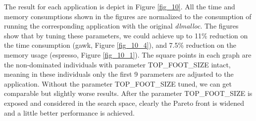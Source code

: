 The result for each application is depict in Figure \ref{fig_10}. All the time and memory consumptions shown in the figures are normalized to the consumption of running the corresponding application with the original \emph{dlmalloc}. The figures show that by tuning these parameters, we could achieve up to 11\% reduction on the time consumption (gawk, Figure \ref{fig_10_4}), and 7.5\% reduction on the memory usage (espresso, Figure \ref{fig_10_1}). The square points in each graph are the non-dominated individuals with parameter TOP\_FOOT\_SIZE intact, meaning in these individuals only the first 9 parameters are adjusted to the application. Without the parameter TOP\_FOOT\_SIZE tuned, we can get comparable but slightly worse results. After the parameter TOP\_FOOT\_SIZE is exposed and considered in the search space, clearly the Pareto front is widened and a little better performance is achieved.
